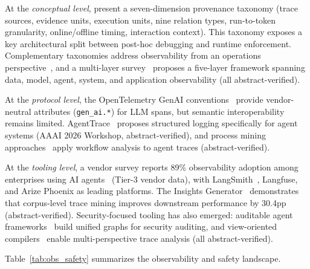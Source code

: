 At the \emph{conceptual level}, \cite{agenttraces2026} present a seven-dimension provenance taxonomy (trace sources, evidence units, execution units, nine relation types, run-to-token granularity, online/offline timing, interaction context). This taxonomy exposes a key architectural split between post-hoc debugging and runtime enforcement. Complementary taxonomies address observability from an operations perspective~\cite{agentopscsiro2024, architectingops2026, agentsysops2026}, and a multi-layer survey~\cite{aiobsmultilayer2026} proposes a five-layer framework spanning data, model, agent, system, and application observability (all abstract-verified).

At the \emph{protocol level}, the OpenTelemetry GenAI conventions~\cite{opentelemetry2026} provide vendor-neutral attributes (\texttt{gen\_ai.*}) for LLM spans, but semantic interoperability remains limited. AgentTrace~\cite{agenttrace2026} proposes structured logging specifically for agent systems (AAAI 2026 Workshop, abstract-verified), and process mining approaches~\cite{processobserv2025} apply workflow analysis to agent traces (abstract-verified).

At the \emph{tooling level}, a vendor survey reports 89\% observability adoption among enterprises using AI agents~\cite{zapier2025} (Tier-3 vendor data), with LangSmith~\cite{langsmith2026}, Langfuse, and Arize Phoenix as leading platforms. The Insights Generator~\cite{insightsgenerator2026} demonstrates that corpus-level trace mining improves downstream performance by 30.4pp (abstract-verified). Security-focused tooling has also emerged: auditable agent frameworks~\cite{auditableagents2026, secaudit2026} build unified graphs for security auditing, and view-oriented compilers~\cite{viewcompiler2026} enable multi-perspective trace analysis (all abstract-verified).

Table~\ref{tab:obs_safety} summarizes the observability and safety landscape.

